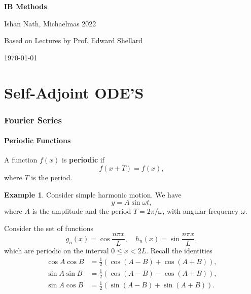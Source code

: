 \documentclass[12pt]{article}
\theoremstyle{definition}
\newtheorem{example}{Example}[section]
\theoremstyle{remark}
\begin{document}
\hypersetup{pageanchor=false}
\begin{titlepage}
	\begin{center}
		\vspace*{1em}
		\Huge
		\textbf{IB Methods}

		\vspace{1em}
		\large
		Ishan Nath, Michaelmas 2022

		\vspace{1.5em}

		\Large

		Based on Lectures by Prof. Edward Shellard

		\vspace{1em}

		\large
		\today
	\end{center}
	
\end{titlepage}
\hypersetup{pageanchor=true}

\tableofcontents

\newpage

\part{Self-Adjoint ODE'S}%
\label{prt:self_adjoint_ode_s}

\section{Fourier Series}%
\label{sec:fourier_series}

\subsection{Periodic Functions}%
\label{sub:periodic_functions}

A function $f(x)$ is \textbf{periodic} if
\[
	f(x + T) = f(x)
,\]
where $T$ is the period.

\begin{adjustbox}{minipage = \columnwidth - 25.5pt, margin=1em, frame=1pt, margin=0em}
	\begin{example} Consider simple harmonic motion. We have
\[
y = A \sin \omega t
,\]
where $A$ is the amplitude and the period $T = 2 \pi / \omega$, with angular frequency $\omega$.
\end{example}
\end{adjustbox}

Consider the set of functions
\[
	g_n(x) = \cos \frac{n \pi x}{L}, \quad h_n(x) = \sin \frac{n \pi x}{L}
,\]
which are periodic on the interval $0 \leq x < 2L$. Recall the identities
\begin{align*}
	\cos A \cos B &= \frac{1}{2} \left(\cos(A - B) + \cos (A + B) \right), \\
	\sin A \sin B &= \frac{1}{2} \left( \cos(A - B) - \cos(A + B) \right), \\
	\sin A \cos B &=  \frac{1}{2} \left( \sin(A - B) + \sin(A + B) \right).
\end{align*}
\end{document}
